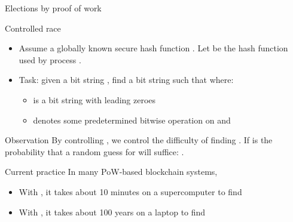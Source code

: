 \begin{slide}{Elections by proof of work}
  \begin{block}{Controlled race}
    \begin{itemize}
    \item Assume a globally known secure hash function . Let  be the hash function
      used by process .
    \item Task: given a bit string , find a bit string  such that
       where:
      \begin{itemize}
      \item {} is a bit string with  leading zeroes
      \item {} denotes some predetermined bitwise operation on 
        and  
      \end{itemize}
    \end{itemize}
  \end{block}
  \begin{alertblock}{Observation}
    By controlling , we control the difficulty of finding . If 
    is the probability that a random guess for  will suffice: .
  \end{alertblock}
  \begin{block}{Current practice}
    In many PoW-based blockchain systems, 
    \begin{itemize}%
    \item With , it takes about 10 minutes on a supercomputer to find 
    \item With , it takes about 100 years on a laptop to find 
    \end{itemize}
  \end{block}
\end{slide}
